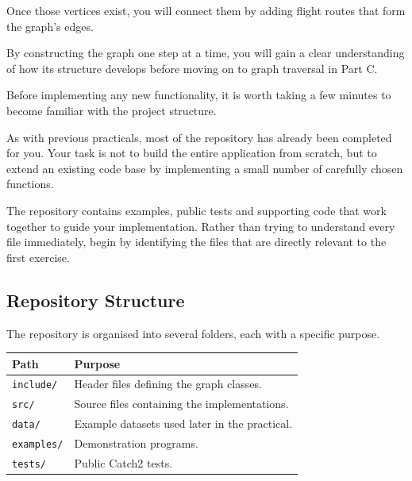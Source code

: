 \documentclass{csc2059practical}
\begin{document}
Once those vertices exist, you will connect them by adding flight routes that
form the graph’s edges.

By constructing the graph one step at a time, you will gain a clear
understanding of how its structure develops before moving on to graph traversal
in Part C.



Before implementing any new functionality, it is worth taking a few minutes to
become familiar with the project structure.

As with previous practicals, most of the repository has already been completed
for you. Your task is not to build the entire application from scratch, but to
extend an existing code base by implementing a small number of carefully chosen
functions.

The repository contains examples, public tests and supporting code that work
together to guide your implementation. Rather than trying to understand every
file immediately, begin by identifying the files that are directly relevant to
the first exercise.


\subsection*{Repository Structure}

The repository is organised into several folders, each with a specific purpose.

\begin{center}
\begin{tabular}{p{} p{}}
\toprule
\textbf{Path} & \textbf{Purpose} \\
\midrule
\texttt{include/} & Header files defining the graph classes. \\
\texttt{src/}     & Source files containing the implementations. \\
\texttt{data/}    & Example datasets used later in the practical. \\
\texttt{examples/}& Demonstration programs. \\
\texttt{tests/}   & Public Catch2 tests. \\
\bottomrule
\end{tabular}
\end{center}
\end{document}
